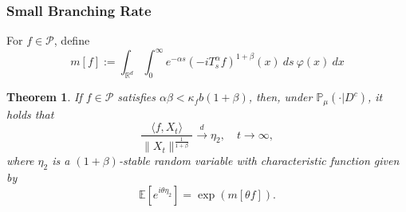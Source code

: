 \documentclass[12pt,oneside,english]{amsart}
\theoremstyle{plain}
\newtheorem{thm}{Theorem}[section]
\theoremstyle{definition}
\numberwithin{equation}{section}
\begin{document}
\subsubsection{Small Branching Rate}

For $f\in \mathcal{P}$, define
$$m[f]:=\int_{\mathbb{R}^d}\int_0^{\infty} e^{-\alpha s}(-iT_{s}^{\alpha}f)^{1+\beta}(x)~ds~\varphi(x)~dx$$
\begin{thm}\label{Theorem13}
    If $f\in\mathcal{P}$ satisfies  $\alpha\beta<\kappa_f b(1+\beta)$, then, under $\mathbb{P}_{\mu}(\cdot|D^c)$, it holds that
    $$\frac{\langle f,X_t\rangle}{\|X_t\|^{\frac{1}{1+\beta}}}\xrightarrow{d} \eta_2, \quad t\rightarrow \infty,$$
    where $\eta_2$ is a $(1+\beta)$-stable random variable with characteristic function given by
    $$\mathbb{E} [e^{i\theta \eta_2}]=\exp(m[\theta f]).$$
\end{thm}
\end{document}
